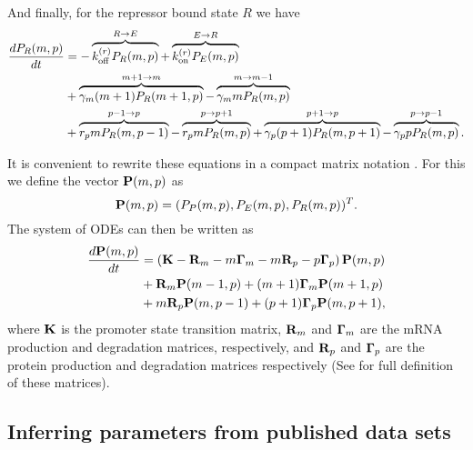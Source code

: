 And finally, for the repressor bound state $R$ we have
\begin{equation}
  \begin{aligned}
    \dt{P_R(m, p)} &=
    - \overbrace{\kroff P_R(m, p)}^{R \rightarrow E} %
    + \overbrace{\kron P_E(m, p)}^{E \rightarrow R}\\ %
    &+ \overbrace{\gm (m + 1) P_R(m+1 , p)}^{m+1 \rightarrow m} %
    - \overbrace{\gm m P_R(m , p)}^{m \rightarrow m-1}\\ %
    &+ \overbrace{r_p m P_R(m, p - 1)}^{p-1 \rightarrow p} %
    - \overbrace{r_p m P_R(m, p)}^{p \rightarrow p+1} %
    + \overbrace{\gp (p + 1) P_R(m, p + 1)}^{p + 1 \rightarrow p} %
    - \overbrace{\gp p P_R(m, p)}^{p \rightarrow p-1}. %
  \end{aligned}
\end{equation}

It is convenient to rewrite these equations in a compact matrix notation
\cite{Sanchez2013}. For this we define the vector $\mathbf{P}(m, p)$ as
\begin{equation}
  \mathbf{P}(m, p) = (P_P(m, p), P_E(m, p), P_R(m, p))^T.
\end{equation}
The system of ODEs can then be written as
\begin{equation}
  \begin{aligned}
    {d{\mathbf{P}(m, p)} \over dt} &= \left( \mathbf{K} -\mathbf{R}_m -m\mathbf{\Gamma}_m -m\mathbf{R}_p -p\mathbf{\Gamma}_p \right) \mathbf{P}(m, p)\\
    &+ \mathbf{R}_m \mathbf{P}(m-1, p)
    + (m + 1) \mathbf{\Gamma}_m \mathbf{P}(m + 1, p)\\
    &+ m \mathbf{R}_p \mathbf{P}(m, p - 1)
    + (p + 1) \mathbf{\Gamma}_p \mathbf{P}(m, p + 1),
  \end{aligned}
  \label{eq_cme_matrix}
\end{equation}
where $\mathbf{K}$ is the promoter state transition matrix, $\mathbf{R}_m$ and $\mathbf{\Gamma}_m$ are the
mRNA production and degradation matrices, respectively, and $\mathbf{R}_p$ and $\mathbf{\Gamma}_p$ are
the protein production and degradation matrices respectively (See
 for full definition of these matrices).

\subsection{Inferring parameters from published data sets}

